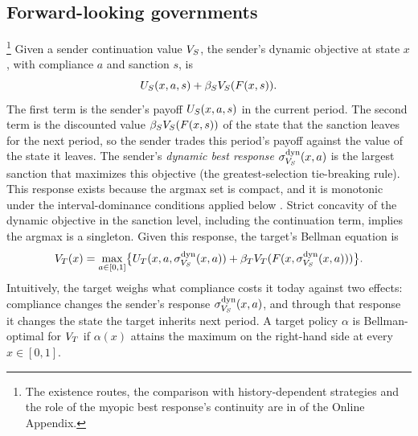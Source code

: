 \subsection{Forward-looking governments}
\label{sec:model:equilibrium}
\label{sec:model:forward}

\footnote{The existence routes, the comparison with
history-dependent strategies and the role of the myopic best response's
continuity are in  of the Online
Appendix.} Given a sender continuation value $V_S$, the sender's dynamic objective at
state $x$, with compliance $a$ and sanction $s$, is
\begin{equation}
U_S(x,a,s)+\beta_SV_S(F(x,s)).
\label{eq:sender-obj}
\end{equation}
The first term is the sender's payoff $U_S(x,a,s)$ in the current period. The second
term is the discounted value $\beta_SV_S(F(x,s))$ of the state that the sanction leaves
for the next period, so the sender trades this period's payoff against the value of the
state it leaves.
The sender's \emph{dynamic best response} $\sigma^{\mathrm{dyn}}_{V_S}(x,a)$ is the largest
sanction that maximizes this objective (the greatest-selection tie-breaking rule).
This response exists because the argmax set is compact, and it is monotonic under the
interval-dominance conditions applied below \citep[Thm.~1]{QuahStrulovici2009}. Strict
concavity of the dynamic objective in the sanction level, including the continuation
term, implies the argmax is a singleton. Given this response, the target's Bellman
equation is
\begin{equation}
V_T(x)=\max_{a\in[0,1]}\bigl\{U_T(x,a,\sigma^{\mathrm{dyn}}_{V_S}(x,a))
   +\beta_TV_T(F(x,\sigma^{\mathrm{dyn}}_{V_S}(x,a)))\bigr\}.
\label{eq:T-bellman}
\end{equation}
Intuitively, the target weighs what compliance costs it today against two effects:
compliance changes the sender's response $\sigma^{\mathrm{dyn}}_{V_S}(x,a)$, and through that response
it changes the state the target inherits next period. A target policy $\alpha$ is Bellman-optimal for $V_T$ if $\alpha(x)$ attains the
maximum on the right-hand side at every $x\in[0,1]$.

